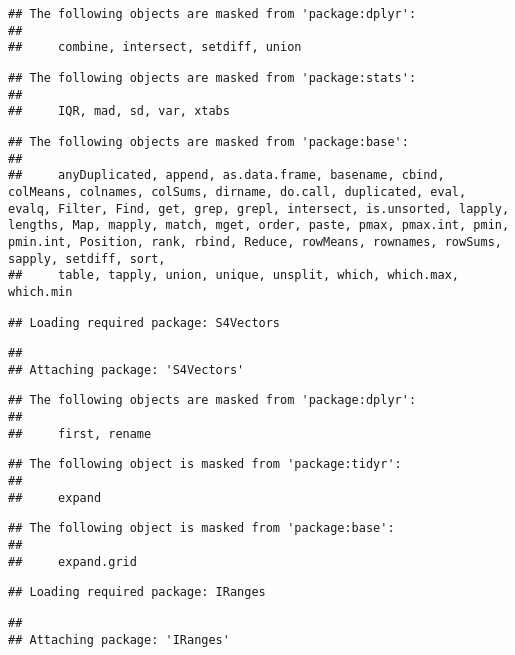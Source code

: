 \documentclass[]{article}
\begin{document}
\begin{verbatim}
## The following objects are masked from 'package:dplyr':
## 
##     combine, intersect, setdiff, union
\end{verbatim}

\begin{verbatim}
## The following objects are masked from 'package:stats':
## 
##     IQR, mad, sd, var, xtabs
\end{verbatim}

\begin{verbatim}
## The following objects are masked from 'package:base':
## 
##     anyDuplicated, append, as.data.frame, basename, cbind, colMeans, colnames, colSums, dirname, do.call, duplicated, eval, evalq, Filter, Find, get, grep, grepl, intersect, is.unsorted, lapply, lengths, Map, mapply, match, mget, order, paste, pmax, pmax.int, pmin, pmin.int, Position, rank, rbind, Reduce, rowMeans, rownames, rowSums, sapply, setdiff, sort,
##     table, tapply, union, unique, unsplit, which, which.max, which.min
\end{verbatim}

\begin{verbatim}
## Loading required package: S4Vectors
\end{verbatim}

\begin{verbatim}
## 
## Attaching package: 'S4Vectors'
\end{verbatim}

\begin{verbatim}
## The following objects are masked from 'package:dplyr':
## 
##     first, rename
\end{verbatim}

\begin{verbatim}
## The following object is masked from 'package:tidyr':
## 
##     expand
\end{verbatim}

\begin{verbatim}
## The following object is masked from 'package:base':
## 
##     expand.grid
\end{verbatim}

\begin{verbatim}
## Loading required package: IRanges
\end{verbatim}

\begin{verbatim}
## 
## Attaching package: 'IRanges'
\end{verbatim}
\end{document}
